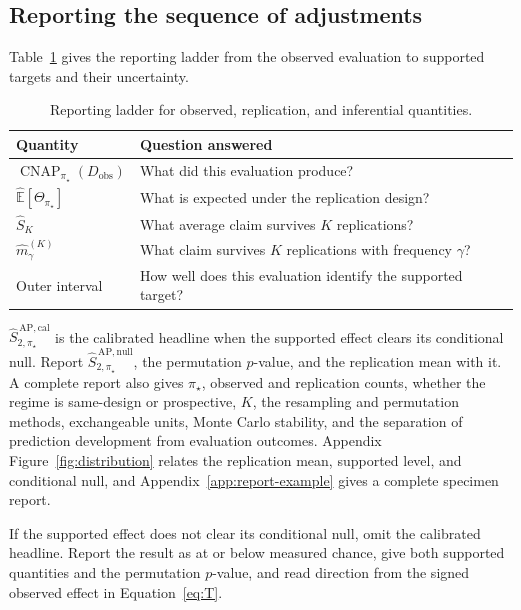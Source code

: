 \documentclass[11pt]{article}
\newcommand{\CNAP}{\operatorname{CNAP}}
\newcommand{\Tpi}{\CNAP_{\pi_\star}}
\newcommand{\E}{\mathbb{E}}
\newcommand{\SAPnullHat}{\widehat S_{2,\pi_\star}^{\,\mathrm{AP,null}}}
\newcommand{\SAPcalHat}{\widehat S_{2,\pi_\star}^{\,\mathrm{AP,cal}}}
\theoremstyle{remark}
\begin{document}
\subsection{Reporting the sequence of adjustments}
\label{sec:reporting}

Table~\ref{tab:ladder} gives the reporting ladder from the observed evaluation to supported targets and their uncertainty.

\begin{table}[ht]
\centering
\caption{Reporting ladder for observed, replication, and inferential quantities.}
\label{tab:ladder}
\begin{tabularx}{\textwidth}{@{}>{\raggedright\arraybackslash}p{}>{\raggedright\arraybackslash}X@{}}
\toprule
Quantity & Question answered \\
\midrule
$\Tpi(D_{\mathrm{obs}})$ & What did this evaluation produce? \\
$\widehat{\E}[\Theta_{\pi_\star}]$ & What is expected under the replication design? \\
$\widehat S_K$ & What average claim survives $K$ replications? \\
$\widehat m_\gamma^{(K)}$ & What claim survives $K$ replications with frequency $\gamma$? \\
Outer interval & How well does this evaluation identify the supported target? \\
\bottomrule
\end{tabularx}
\end{table}

$\SAPcalHat$ is the calibrated headline when the supported effect clears its conditional null. Report $\SAPnullHat$, the permutation $p$-value, and the replication mean with it. A complete report also gives $\pi_\star$, observed and replication counts, whether the regime is same-design or prospective, $K$, the resampling and permutation methods, exchangeable units, Monte Carlo stability, and the separation of prediction development from evaluation outcomes. Appendix Figure~\ref{fig:distribution} relates the replication mean, supported level, and conditional null, and Appendix~\ref{app:report-example} gives a complete specimen report.

If the supported effect does not clear its conditional null, omit the calibrated headline. Report the result as at or below measured chance, give both supported quantities and the permutation $p$-value, and read direction from the signed observed effect in Equation~\eqref{eq:T}.
\end{document}
